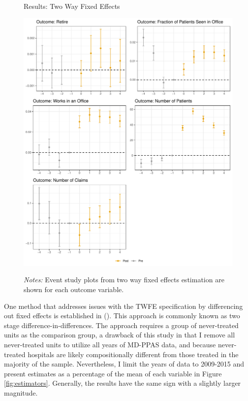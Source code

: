 \documentclass[12pt]{article}
\begin{document}
\begin{figure}
    \centering
    \captionsetup{width=.8\linewidth}
    \caption{Results: Two Way Fixed Effects}
    \includegraphics[scale=.6]{Objects/twfe_plot.pdf}
    \label{fig:twfe}
    \vspace{2mm}
    \caption*{\footnotesize{\textit{Notes:} Event study plots from two way fixed effects estimation are shown for each outcome variable.}}
\end{figure}

One method that addresses issues with the TWFE specification by differencing out fixed effects is established in \citeauthor{gardner2021two} (\citeyear{gardner2021two}). This approach is commonly known as two stage difference-in-differences. The approach requires a group of never-treated units as the comparison group, a drawback of this study in that I remove all never-treated units to utilize all years of MD-PPAS data, and because never-treated hospitals are likely compositionally different from those treated in the majority of the sample. Nevertheless, I limit the years of data to 2009-2015 and present estimates as a percentage of the mean of each variable in Figure \ref{fig:estimators}. Generally, the results have the same sign with a slightly larger magnitude. 
\end{document}
